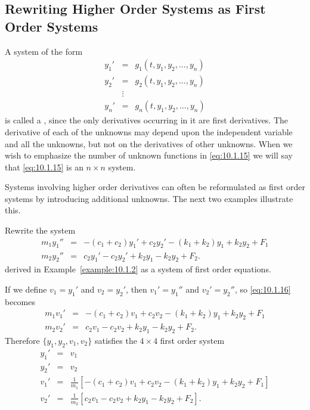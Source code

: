 \documentclass{ximera}
\begin{document}
\subsection*{Rewriting Higher Order  Systems as First Order Systems}

A system of the form
\begin{equation} \label{eq:10.1.15}
\begin{array}{ccl}
y_1'&=&g_1(t,y_1,y_2,\dots,y_n)\\
y_2'&=&g_2(t,y_1,y_2,\dots,y_n)\\
&\vdots&\\
y_n'&=&g_n(t,y_1,y_2,\dots,y_n)
\end{array}
\end{equation}
is called a , since the only derivatives
occurring in it are first derivatives. The derivative of
each of the unknowns may depend upon the independent variable and all
the unknowns, but not on the derivatives of other unknowns. When we
wish to emphasize the number of unknown functions in \eqref{eq:10.1.15} we
will say that \eqref{eq:10.1.15} is an $n\times n$ system.

Systems involving higher order derivatives can often be reformulated
as first order systems by introducing additional unknowns. The next
two examples illustrate this.

\begin{example}\label{example:10.1.4}
Rewrite the system
\begin{equation} \label{eq:10.1.16}
\begin{array}{rcl}
m_1y_1''&=&-(c_1+c_2)y_1'+c_2y_2'-(k_1+k_2)y_1+k_2y_2+F_1\\
m_2y_2''&=&c_2y_1'-c_2y_2'+k_2y_1-k_2y_2+F_2.
\end{array}
\end{equation}
derived in Example~\ref{example:10.1.2}  as a system of first order
equations.

\begin{explanation}
If we define $v_1=y_1'$ and $v_2=y_2'$,  then $v_1'=y_1''$ and
$v_2'=y_2''$,  so \eqref{eq:10.1.16} becomes
$$
\begin{array}{rcl}
m_1v_1'&=&-(c_1+c_2)v_1+c_2v_2-(k_1+k_2)y_1+k_2y_2+F_1\\
m_2v_2'&=&c_2v_1-c_2v_2+k_2y_1-k_2y_2+F_2.
\end{array}
$$
Therefore $\{y_1,y_2,v_1,v_2\}$  satisfies the $4\times4$ first order
system
\begin{equation} \label{eq:10.1.17}
\begin{array}{rcl}
y_1'&=&v_1\\
y_2'&=&v_2\\
v_1'&=&\frac{1}{m_1}\left[-(c_1+c_2)v_1+c_2v_2-(k_1+k_2)y_1+k_2y_2+F_1\right]\\
v_2'&=&\frac{1}{m_2}\left[c_2v_1-c_2v_2+k_2y_1-k_2y_2+F_2\right].
 \end{array}
\end{equation}
\end{explanation}
\end{example}
\end{document}
